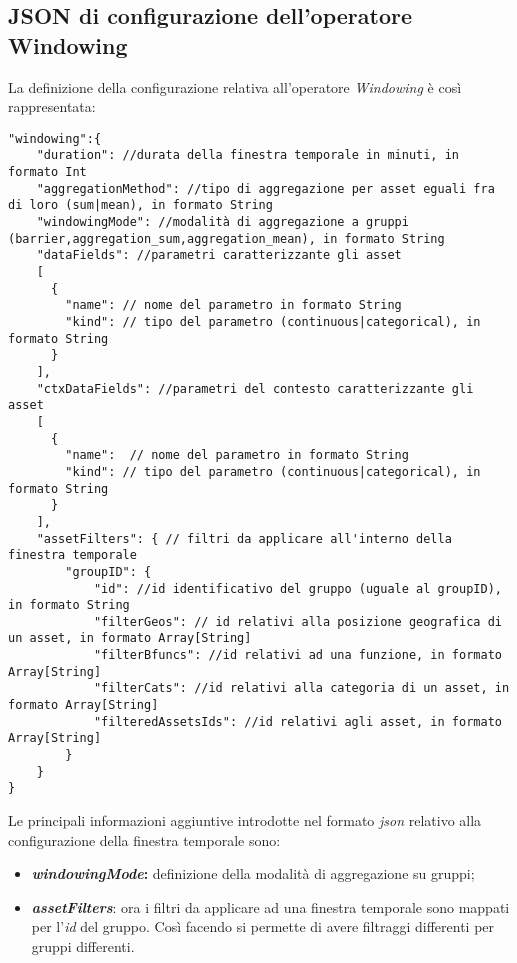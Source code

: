 \subsection{JSON di configurazione dell'operatore Windowing}\label{sec:json-windowing}
La definizione della configurazione relativa all'operatore \textit{Windowing} è così rappresentata:

\begin{verbatim}
"windowing":{
    "duration": //durata della finestra temporale in minuti, in formato Int
    "aggregationMethod": //tipo di aggregazione per asset eguali fra di loro (sum|mean), in formato String
    "windowingMode": //modalità di aggregazione a gruppi (barrier,aggregation_sum,aggregation_mean), in formato String
    "dataFields": //parametri caratterizzante gli asset
    [
      {
        "name": // nome del parametro in formato String
        "kind": // tipo del parametro (continuous|categorical), in formato String
      }
    ],
    "ctxDataFields": //parametri del contesto caratterizzante gli asset 
    [
      {
        "name":  // nome del parametro in formato String
        "kind": // tipo del parametro (continuous|categorical), in formato String
      }
    ],
    "assetFilters": { // filtri da applicare all'interno della finestra temporale
        "groupID": {
            "id": //id identificativo del gruppo (uguale al groupID), in formato String
            "filterGeos": // id relativi alla posizione geografica di un asset, in formato Array[String]
            "filterBfuncs": //id relativi ad una funzione, in formato Array[String]
            "filterCats": //id relativi alla categoria di un asset, in formato Array[String]
            "filteredAssetsIds": //id relativi agli asset, in formato Array[String]
        } 
    }
}
\end{verbatim}
Le principali informazioni aggiuntive introdotte nel formato \textit{\gls{json}} relativo alla configurazione della finestra temporale sono:
\begin{itemize}
	\item{\textbf{\textit{windowingMode}:} definizione della modalità di aggregazione su gruppi;}
	\item{\textbf{\textit{assetFilters}}: ora i filtri da applicare ad una finestra temporale sono mappati per l'\textit{id} del gruppo. Così facendo si permette di avere filtraggi differenti per gruppi differenti.}
\end{itemize} 


